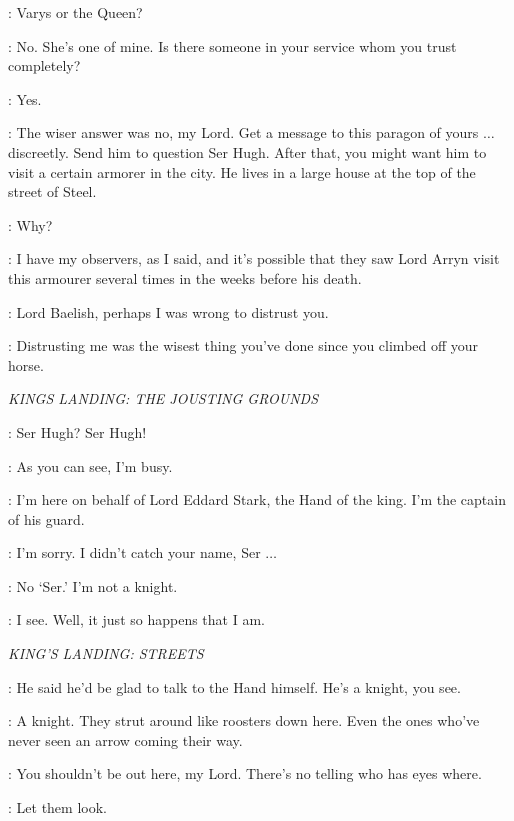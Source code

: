 \NED: Varys or the Queen? 

\LITTLEFINGER: No. She's one of mine. Is there someone in your service whom you trust completely? 

\NED: Yes. 

\LITTLEFINGER: The wiser answer was no, my Lord. Get a message to this paragon of yours $\ldots$ discreetly. Send him to question Ser Hugh. After that, you might want him to visit a certain armorer in the city. He lives in a large house at the top of the street of Steel. 

\NED: Why? 

\LITTLEFINGER: I have my observers, as I said, and it's possible that they saw Lord Arryn visit this armourer several times in the weeks before his death. 

\NED: Lord Baelish, perhaps I was wrong to distrust you. 

\LITTLEFINGER: Distrusting me was the wisest thing you've done since you climbed off your horse. 

\scene

\textit{KINGS LANDING: THE JOUSTING GROUNDS}

\JORY: Ser Hugh? Ser Hugh! 

\SERHUGH: As you can see, I'm busy. 

\JORY: I'm here on behalf of Lord Eddard Stark, the Hand of the king. I'm the captain of his guard. 

\SERHUGH: I'm sorry. I didn't catch your name, Ser $\ldots$ 

\JORY: No `Ser.' I'm not a knight. 

\SERHUGH: I see. Well, it just so happens that I am. 

\scene

\textit{KING'S LANDING: STREETS}


\JORY: He said he'd be glad to talk to the Hand himself. He's a knight, you see. 

\NED: A knight. They strut around like roosters down here. Even the ones who've never seen an arrow coming their way. 

\JORY: You shouldn't be out here, my Lord. There's no telling who has eyes where. 

\NED: Let them look. 


